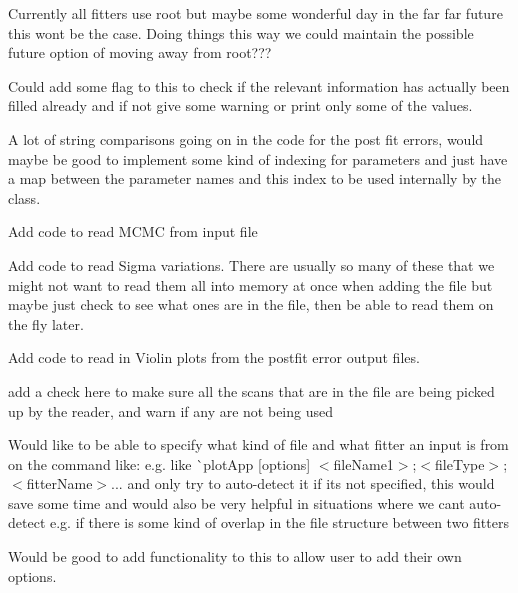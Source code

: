 \begin{DoxyRefList}
Currently all fitters use root but maybe some wonderful day in the far far future this wont be the case. Doing things this way we could maintain the possible future option of moving away from root???  
\item[Member \mbox{\hyperlink{structMaCh3Plotting_1_1InputFile_a4b3753ca1fa1a399e519aa15bca8658a}{Ma\+Ch3\+Plotting\+::Input\+File\+::Summarise}} () const]\label{todo__todo000017}%
%
Could add some flag to this to check if the relevant information has actually been filled already and if not give some warning or print only some of the values.  
\item[Class \mbox{\hyperlink{classMaCh3Plotting_1_1InputManager}{Ma\+Ch3\+Plotting\+::Input\+Manager}} ]\label{todo__todo000016}%
%
A lot of string comparisons going on in the code for the post fit errors, would maybe be good to implement some kind of indexing for parameters and just have a map between the parameter names and this index to be used internally by the class. 



Add code to read MCMC from input file 



Add code to read Sigma variations. There are usually so many of these that we might not want to read them all into memory at once when adding the file but maybe just check to see what ones are in the file, then be able to read them on the fly later. 



Add code to read in Violin plots from the postfit error output files.  
\item[Member \mbox{\hyperlink{classMaCh3Plotting_1_1InputManager_aad778d8694f9b581d09279584733f6ea}{Ma\+Ch3\+Plotting\+::Input\+Manager\+::fill\+File\+Info}} (\mbox{\hyperlink{structMaCh3Plotting_1_1InputFile}{Input\+File}} \&input\+File\+Def, bool print\+Thoughts=true)]\label{todo__todo000015}%
%
add a check here to make sure all the scans that are in the file are being picked up by the reader, and warn if any are not being used 

\label{todo__todo000014}%
%
Would like to be able to specify what kind of file and what fitter an input is from on the command like\+: e.\+g. like \`{}plot\+App \mbox{[}options\mbox{]} $<$file\+Name1$>$;$<$file\+Type$>$;$<$fitter\+Name$>$... and only try to auto-\/detect it if its not specified, this would save some time and would also be very helpful in situations where we can\textquotesingle{}t auto-\/detect e.\+g. if there is some kind of overlap in the file structure between two fitters  
\item[Member \mbox{\hyperlink{classMaCh3Plotting_1_1PlottingManager_aeb042d09d55644d8b35632f66f1832b6}{Ma\+Ch3\+Plotting\+::Plotting\+Manager\+::add\+User\+Option}} ()]\label{todo__todo000022}%
%
Would be good to add functionality to this to allow user to add their own options. 




\end{DoxyRefList}
